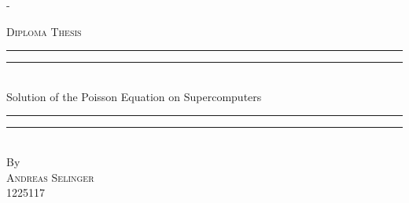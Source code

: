 %
%
% 
%
%
\begin{titlingpage}
\begin{SingleSpace}
\calccentering{\unitlength} 
\begin{adjustwidth*}{\unitlength}{-\unitlength}
\vspace*{0mm}
\begin{center}
{\Large \textsc{Diploma Thesis}}\\[4mm]
\vspace*{15mm}
\rule[0.5ex]{\linewidth}{2pt}\vspace*{-\baselineskip}\vspace*{3.2pt}
\rule[0.5ex]{\linewidth}{1pt}\\[\baselineskip]
{\HUGE Solution of the Poisson Equation on Supercomputers}\\[4mm]
\rule[0.5ex]{\linewidth}{1pt}\vspace*{-\baselineskip}\vspace{3.2pt}
\rule[0.5ex]{\linewidth}{2pt}\\
\vspace{6.5mm}
{\large By}\\
\vspace{6.5mm}
{\large\textsc{Andreas Selinger}\\1225117}\\
\vspace{11mm}

\end{center}
\end{adjustwidth*}
\end{SingleSpace}
\end{titlingpage}
